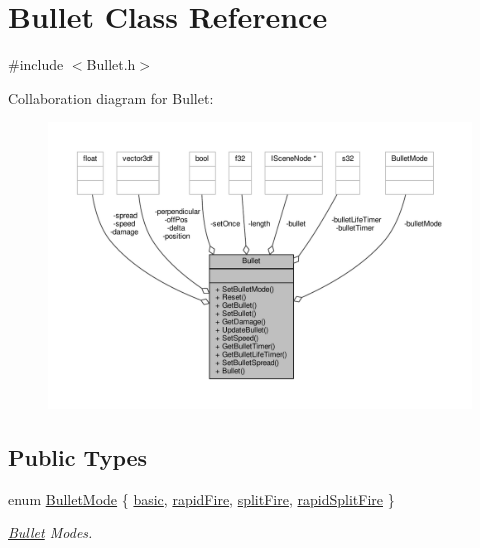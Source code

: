 \hypertarget{class_bullet}{\section{Bullet Class Reference}
\label{class_bullet}
}




  




{\ttfamily \#include $<$Bullet.\-h$>$}



Collaboration diagram for Bullet\-:
\nopagebreak
\begin{figure}[H]
\begin{center}
\leavevmode
\includegraphics[width=350pt]{class_bullet__coll__graph}
\end{center}
\end{figure}
\subsection*{Public Types}
\begin{DoxyCompactItemize}
\item 
enum \hyperlink{class_bullet_a5d75af562dbb5f6f4f68584ca9193aa5}{Bullet\-Mode} \{ \hyperlink{class_bullet_a5d75af562dbb5f6f4f68584ca9193aa5ab15c8d61fdbcf364ff659250cfff9d3d}{basic}, 
\hyperlink{class_bullet_a5d75af562dbb5f6f4f68584ca9193aa5a6eae620163c016a1c99d33efa49d5b98}{rapid\-Fire}, 
\hyperlink{class_bullet_a5d75af562dbb5f6f4f68584ca9193aa5a70b93c5ed87213fabada7bf06009499a}{split\-Fire}, 
\hyperlink{class_bullet_a5d75af562dbb5f6f4f68584ca9193aa5acbc3fe102aee0027cf26135962ff7fc7}{rapid\-Split\-Fire}
 \}
\begin{DoxyCompactList}\small\item\em \hyperlink{class_bullet}{Bullet} Modes. \end{DoxyCompactList}\end{DoxyCompactItemize}
